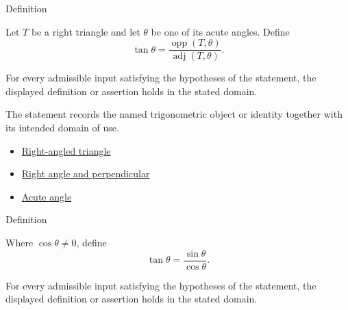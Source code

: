 

\begin{definitionbox}{Definition}
\begin{definition}
\label{def:right-triangle-tangent}
Let $T$ be a right triangle and let $\theta$ be one of its acute angles. Define
\[
\tan\theta=\frac{\operatorname{opp}(T,\theta)}{\operatorname{adj}(T,\theta)}.
\]
\end{definition}
\end{definitionbox}
\begin{remark*}
For every admissible input satisfying the hypotheses of the statement, the
displayed definition or assertion holds in the stated domain.
\end{remark*}

\begin{remark*}[Interpretation]
The statement records the named trigonometric object or identity together with
its intended domain of use.
\end{remark*}

\begin{dependencies}
\begin{itemize}
  \item \hyperref[def:euclid-triangle-angle-classes]{Right-angled triangle}
  \item \hyperref[def:euclid-right-angle-and-perpendicular]{Right angle and perpendicular}
  \item \hyperref[def:euclid-acute-angle]{Acute angle}
\end{itemize}
\end{dependencies}



\begin{definitionbox}{Definition}
\begin{definition}
\label{def:extended-tangent}
Where $\cos\theta\neq 0$, define
\[
  \tan\theta=\frac{\sin\theta}{\cos\theta}.
\]
\end{definition}
\end{definitionbox}
\begin{remark*}
For every admissible input satisfying the hypotheses of the statement, the
displayed definition or assertion holds in the stated domain.
\end{remark*}

